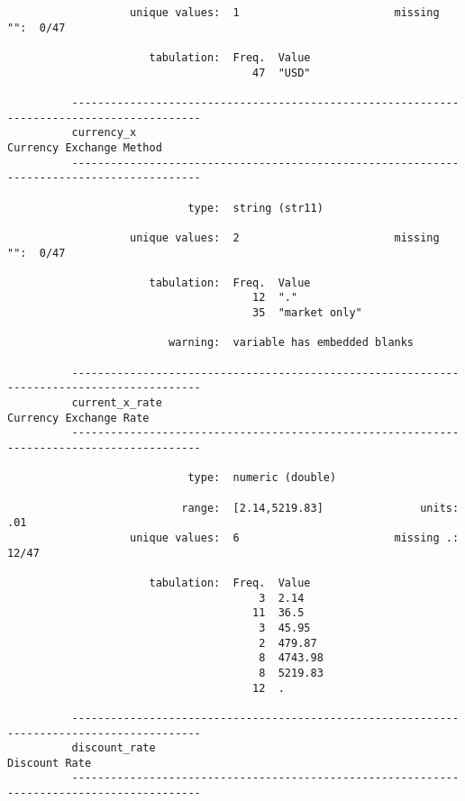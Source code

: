 \documentclass{article}
\begin{document}
\begin{verbatim}
                   unique values:  1                        missing "":  0/47
          
                      tabulation:  Freq.  Value
                                      47  "USD"
          
          ------------------------------------------------------------------------------------------
          currency_x                                                        Currency Exchange Method
          ------------------------------------------------------------------------------------------
          
                            type:  string (str11)
          
                   unique values:  2                        missing "":  0/47
          
                      tabulation:  Freq.  Value
                                      12  "."
                                      35  "market only"
          
                         warning:  variable has embedded blanks
          
          ------------------------------------------------------------------------------------------
          current_x_rate                                                      Currency Exchange Rate
          ------------------------------------------------------------------------------------------
          
                            type:  numeric (double)
          
                           range:  [2.14,5219.83]               units:  .01
                   unique values:  6                        missing .:  12/47
          
                      tabulation:  Freq.  Value
                                       3  2.14
                                      11  36.5
                                       3  45.95
                                       2  479.87
                                       8  4743.98
                                       8  5219.83
                                      12  .
          
          ------------------------------------------------------------------------------------------
          discount_rate                                                                Discount Rate
          ------------------------------------------------------------------------------------------
          

\end{verbatim}
\end{document}
